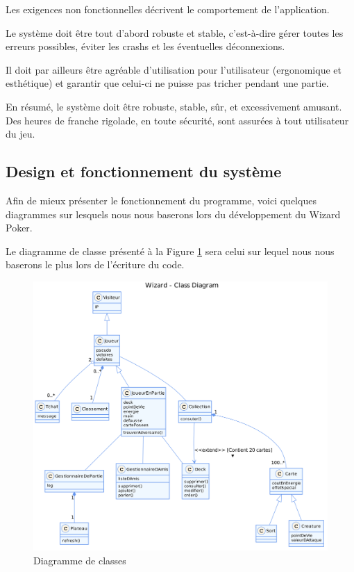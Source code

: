 \documentclass[11pt,a4paper]{article}
\begin{document}
Les exigences non fonctionnelles décrivent le comportement de
l'application.

\medbreak

Le système doit être tout d'abord robuste et stable, c'est-à-dire
gérer toutes les erreurs possibles, éviter les crashs et les éventuelles
déconnexions.

\medbreak

Il doit par ailleurs être agréable d'utilisation pour l'utilisateur
(ergonomique et esthétique) et garantir que celui-ci ne puisse
pas tricher pendant une partie.

\medbreak

En résumé, le système doit être robuste, stable, sûr, et excessivement amusant. Des
heures de franche rigolade, en toute sécurité, sont assurées à tout
utilisateur du jeu.

\subsection{Design et fonctionnement du système}
\label{sec:design}

Afin de mieux présenter le fonctionnement du programme, voici quelques
diagrammes sur lesquels nous nous baserons lors du
développement du Wizard Poker.

\medbreak

Le diagramme de classe présenté à la Figure \ref{fig:class} sera celui sur lequel nous nous baserons le plus lors de l'écriture du code.

\begin{figure}[ht]
  \centering
  \includegraphics[width=1\textwidth]{../uml_files/ClassDiagram.png}
  \caption{\label{fig:class} Diagramme de classes}
\end{figure}
\end{document}
